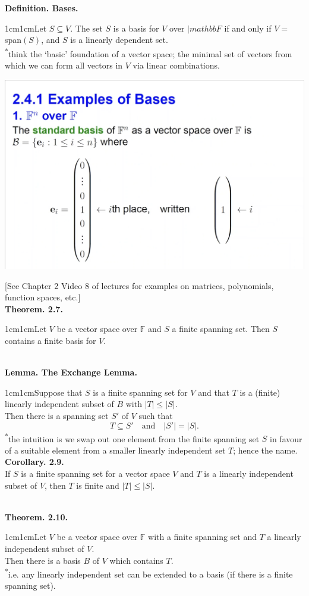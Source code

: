 \documentclass{article}
\newcommand{\definition}[2]{\textbf{Definition. #1.}\begin{adjustwidth}{1cm}{1cm}#2\end{adjustwidth}}
\newcommand{\theorem}[2]{\textbf{Theorem. #1.}\begin{adjustwidth}{1cm}{1cm}#2\end{adjustwidth}}
\newcommand{\lemma}[2]{\textbf{Lemma. #1.}\begin{adjustwidth}{1cm}{1cm}#2\end{adjustwidth}}
\begin{document}
\definition{Bases}{Let $S \subseteq V$. The set $S$ is a basis for $V$ over $|mathbb{F}$ if and only if $V =$ span$(S)$, and $S$ is a linearly dependent set.\\[1\baselineskip]\textsuperscript{*}think the `basic' foundation of a vector space; the minimal set of vectors from which we can form all vectors in $V$ via linear combinations.}
\begin{center}
  \includegraphics[scale=0.18]{assets/basis_eg.png}
\end{center}
[See Chapter 2 Video 8 of lectures for examples on matrices, polynomials, function spaces, etc.]\\[1\baselineskip]
\theorem{2.7}{Let $V$ be a vector space over $\mathbb{F}$ and $S$ a finite spanning set. Then $S$ contains a finite basis for $V$.}~\\
\lemma{The Exchange Lemma}{Suppose that $S$ is a finite spanning set for $V$ and that $T$ is a (finite) linearly independent subset of $B$ with $|T| \leq |S|$.\\Then there is a spanning set $S'$ of $V$ such that \[T \subseteq S' \quad \text{and} \quad |S'| = |S|.\]\textsuperscript{*}the intuition is we swap out one element from the finite spanning set $S$ in favour of a suitable element from a smaller linearly independent set $T$; hence the name.\\[1\baselineskip]
\textbf{Corollary. 2.9.}\\If $S$ is a finite spanning set for a vector space $V$ and $T$ is a linearly independent subset of $V$, then $T$ is finite and $|T| \leq |S|$.}~\\
\theorem{2.10}{Let $V$ be a vector space over $\mathbb{F}$ with a finite spanning set and $T$ a linearly independent subset of $V$.\\Then there is a basis $B$ of $V$ which contains $T$.\\ \textsuperscript{*}i.e. any linearly independent set can be extended to a basis (if there is a finite spanning set).}~\\ 
\end{document}
